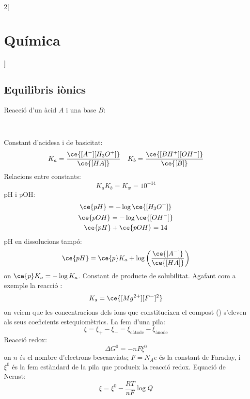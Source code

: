 \documentclass[../../../main.tex]{subfiles}
\begin{document}
\begin{multicols}{2}[\section{Química}]
\subsection{Equilibris iònics}
Reacció d'un àcid $A$ i una base $B$:
\begin{center}
    \\
\end{center}
Constant d'acidesa i de basicitat: $$K_a=\frac{\ce{[A^-][H_3O^+]}}{\ce{[HA]}}\quad K_b=\frac{\ce{[BH^+][OH^-]}}{\ce{[B]}}$$
Relacions entre constants: $$K_aK_b=K_w=10^{-14}$$
pH i pOH:
\begin{gather*}
    \ce{pH}=-\log\ce{[H_3O^+]}\\
    \ce{pOH}=-\log\ce{[OH^-]}\\
    \ce{pH}+\ce{pOH}=14
\end{gather*}
pH en dissolucions tampó: $$\ce{pH}=\ce{p}K_a+\log\left(\frac{\ce{[A^-]}}{\ce{[HA]}}\right)$$ {\footnotesize on $\ce{p}K_a=-\log K_a$.}\newline
Constant de producte de solubilitat. Agafant com a exemple la reacció : $$K_s=\ce{[Mg^{2+}][F^-]^2}$$ {\footnotesize on veiem que les concentracions dels ions que cons\-ti\-tu\-eix\-en el compost () s'eleven als seus coeficients estequiomètrics.}\newline
La fem d'una pila: $$\xi=\xi_+-\xi_-=\xi_\text{càtode}-\xi_\text{ànode}$$
Reacció redox: $$\Delta G^0=-nF\xi^0$$ {\footnotesize on $n$ és el nombre d'electrons bescanviats; $F=N_Ae$ és la constant de Faraday, i $\xi^0$ és la fem estàndard de la pila que produeix la reacció redox.}\newline
Equació de Nernst: $$\xi=\xi^0-\frac{RT}{nF}\log Q$$

\end{multicols}
\end{document}
